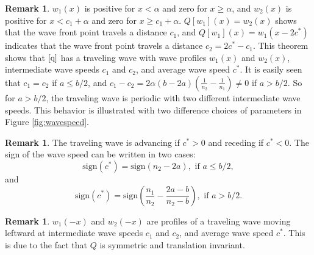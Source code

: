 \documentclass[11pt]{article}
\numberwithin{equation}{section}
\theoremstyle{definition}
\newtheorem{remark}[theorem]{Remark}
\begin{document}
\begin{remark}
$w_1(x)$ is positive for $x<\alpha$ and zero for $x\geq\alpha$, and $w_2(x)$ is positive for $x<c_1+\alpha$ and zero for $x\geq c_1+\alpha$.  $Q[w_1](x)=w_2(x)$ shows that the wave front point travels a distance $c_1$, and $Q[w_1](x)=w_1(x-2c^*)$ indicates that the wave front point travels a distance $c_2=2c^*-c_1$. This theorem shows that $\eqref{q}$ has a traveling wave with wave profiles $w_1(x)$ and $w_2(x)$, intermediate wave speeds $c_1$ and $c_2$,  and average wave speed  $c^*$.  It is easily seen that $c_1=c_2$ if $a \leq b/2$, and $c_1-c_2=2\alpha (b-2a)(\frac{1}{n_2}-\frac{1}{n_1})\not=0$ if $a>b/2$. So for $a>b/2$, the traveling wave is periodic with two different intermediate wave speeds. This behavior is illustrated with two difference choices of parameters in Figure \ref{fig:wavespeed}.
\end{remark}

\begin{remark}
The traveling wave is advancing if $c^*>0$ and receding if $c^*<0$. The sign of the wave speed can be written in two cases:
\begin{equation}
\text{sign}(c^*) = \text{sign}\left(n_2 - 2a\right), \text{ if } a \leq b/2, \end{equation}
and
\begin{equation}
\text{sign}(c^*) =
\text{sign}\left(\frac{n_1}{n_2} - \frac{2a-b}{n_2-b}\right),  \text{ if } a > b/2. 
\end{equation}
\end{remark}

\begin{remark}
$w_1(-x)$ and $w_2(-x)$ are profiles of a traveling wave moving leftward at 
 intermediate wave speeds $c_1$ and $c_2$, and average wave speed  $c^*$. This is due to the fact that $Q$ is symmetric and translation invariant.
\end{remark}
\end{document}
